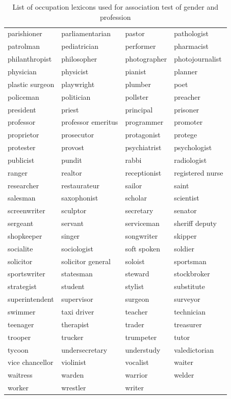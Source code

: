 \documentclass[11pt]{article}
\begin{document}
\begin{table}[t]
    \centering
    \begin{tabular}{l l l l}
    \toprule
        parishioner & parliamentarian & pastor & pathologist \\
        patrolman & pediatrician & performer & pharmacist \\
        philanthropist & philosopher & photographer & photojournalist \\
        physician & physicist & pianist & planner \\
        plastic surgeon & playwright & plumber & poet \\
        policeman & politician & pollster & preacher \\
        president & priest & principal & prisoner \\
        professor & professor emeritus & programmer & promoter \\
        proprietor & prosecutor & protagonist & protege \\
        protester & provost & psychiatrist & psychologist \\
        publicist & pundit & rabbi & radiologist \\
        ranger & realtor & receptionist & registered nurse \\
        researcher & restaurateur & sailor & saint \\
        salesman & saxophonist & scholar & scientist \\
        screenwriter & sculptor & secretary & senator \\
        sergeant & servant & serviceman & sheriff deputy \\
        shopkeeper & singer & songwriter & skipper \\
        socialite & sociologist & soft spoken & soldier \\
        solicitor & solicitor general & soloist & sportsman \\
        sportswriter & statesman & steward & stockbroker \\
        strategist & student & stylist & substitute \\
        superintendent & supervisor & surgeon & surveyor \\
        swimmer & taxi driver & teacher & technician \\
        teenager & therapist & trader & treasurer \\
        trooper & trucker & trumpeter & tutor \\
        tycoon & undersecretary & understudy & valedictorian \\
        vice chancellor & violinist & vocalist & waiter \\
        waitress & warden & warrior & welder \\
        worker & wrestler & writer &  \\
    \bottomrule
    \end{tabular}
    \caption{List of occupation lexicons used for association test of gender and profession}
    \label{tab:occ2}
\end{table}
\end{document}

